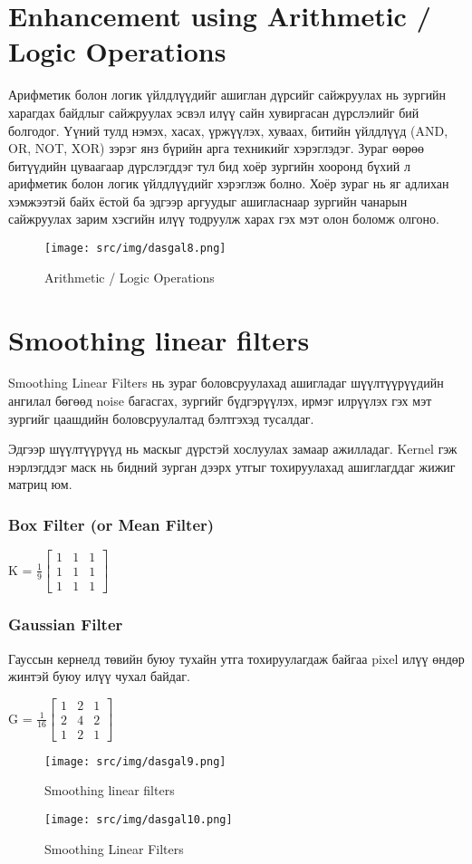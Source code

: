 \section[OR/AND]{Enhancement using Arithmetic / Logic Operations}
Арифметик болон логик үйлдлүүдийг ашиглан дүрсийг сайжруулах нь зургийн
харагдах байдлыг сайжруулах эсвэл илүү сайн хувиргасан дүрслэлийг бий болгодог.
Үүний тулд нэмэх, хасах, үржүүлэх, хуваах, битийн үйлдлүүд (AND, OR, NOT, XOR)
зэрэг янз бүрийн арга техникийг хэрэглэдэг. Зураг өөрөө битүүдийн цуваагаар дүрслэгддэг тул
бид хоёр зургийн хооронд бүхий л арифметик болон логик үйлдлүүдийг хэрэглэж болно.
Хоёр зураг нь яг адлихан хэмжээтэй байх ёстой ба эдгээр аргуудыг ашигласнаар зургийн чанарын сайжруулах
зарим хэсгийн илүү тодруулж харах гэх мэт олон боломж олгоно.
\begin{figure}[h!]
    \centering
    \texttt{[image: src/img/dasgal8.png]}
    \caption{Arithmetic / Logic Operations}
\end{figure}
\newpage
\section[SLF]{Smoothing linear filters}
Smoothing Linear Filters нь зураг боловсруулахад ашигладаг
шүүлтүүрүүдийн ангилал бөгөөд noise багасгах, зургийг бүдгэрүүлэх,
ирмэг илрүүлэх гэх мэт зургийг цаашдийн боловсруулалтад бэлтгэхэд тусалдаг.

Эдгээр шүүлтүүрүүд нь маскыг дүрстэй хослуулах замаар ажилладаг.
Kernel гэж нэрлэгддэг маск нь бидний зурган дээрх утгыг тохируулахад
ашиглагддаг жижиг матриц юм.
\subsubsection{Box Filter (or Mean Filter)}
\begin{center}
    K = $\frac{1}{9}
        \begin{bmatrix}
            1 & 1 & 1 \\
            1 & 1 & 1 \\
            1 & 1 & 1
        \end{bmatrix}$
\end{center}

\subsubsection{Gaussian Filter}
Гауссын кернелд төвийн буюу тухайн утга тохируулагдаж байгаа pixel илүү
өндөр жинтэй буюу илүү чухал байдаг.
\begin{center}
    G = $\frac{1}{16}\begin{bmatrix}
            1 & 2 & 1 \\
            2 & 4 & 2 \\
            1 & 2 & 1
        \end{bmatrix}$
\end{center}


\begin{figure}[h!]
    \centering
    \texttt{[image: src/img/dasgal9.png]}
    \caption{Smoothing linear filters}
\end{figure}

\begin{figure}[h!]
    \centering
    \texttt{[image: src/img/dasgal10.png]}
    \caption{Smoothing Linear Filters}
\end{figure}